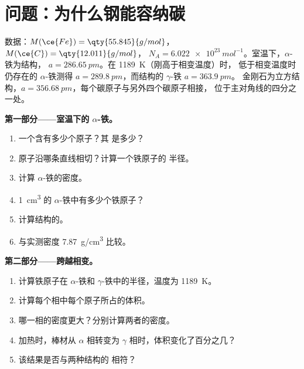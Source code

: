 \section{问题：为什么钢能容纳碳}

\begin{problem}
\label{pb:b1:crystals-metals:1}
数据：$M(\ce{Fe}) = \qty{55.845}{g/mol}$，$M(\ce{C}) = \qty{12.011}{g/mol}$，
$N_A = \qty{6.022e23}{mol^{-1}}$。室温下，$\alpha$-铁为结构，
 $a = \qty{286.65}{pm}$。在 \qty{1189}{K}（刚高于相变温度）时，
低于相变温度时仍存在的 $\alpha$-铁测得
$a = \qty{289.8}{pm}$，而结构的 $\gamma$-铁 $a = \qty{363.9}{pm}$。
金刚石为立方结构，$a = \qty{356.68}{pm}$，每个碳原子与另外四个碳原子相接，
位于主对角线的四分之一处。

\medskip
\noindent\textbf{第一部分——室温下的 $\alpha$-铁。}
\begin{enumerate}
  \item 一个含有多少个原子？其
        是多少？
  \item 原子沿哪条直线相切？计算一个铁原子的
        半径。
  \item 计算 $\alpha$-铁的密度。
  \item \qty{1}{cm^3} 的 $\alpha$-铁中有多少个铁原子？
  \item 计算结构的。
  \item 与实测密度 \qty{7.87}{g/cm^3} 比较。
\end{enumerate}

\medskip
\noindent\textbf{第二部分——跨越相变。}
\begin{enumerate}[resume]
  \item 计算铁原子在 $\alpha$-铁和
        $\gamma$-铁中的半径，温度为 \qty{1189}{K}。
  \item 计算每个相中每个原子所占的体积。
  \item 哪一相的密度更大？分别计算两者的密度。
  \item 加热时，棒材从 $\alpha$ 相转变为
        $\gamma$ 相时，体积变化了百分之几？
  \item 该结果是否与两种结构的
        相符？
\end{enumerate}


\end{problem}
